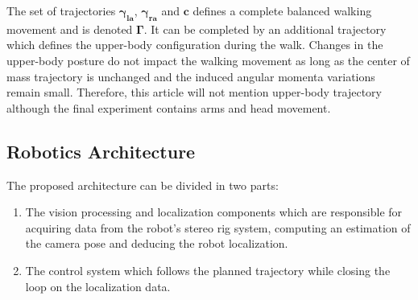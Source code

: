 The set of trajectories $\mathbf{\gamma_{\text{la}}}$, $\mathbf{\gamma_{\text{ra}}}$ and $\mathbf{c}$ defines a complete balanced walking movement and is denoted $\mathbf{\Gamma}$. It can be completed by an additional trajectory which defines the upper-body configuration during the walk. Changes in the upper-body posture do not impact the walking movement as long as the center of mass trajectory is unchanged and the induced angular momenta variations remain small. Therefore, this article will not mention upper-body trajectory although the final experiment contains arms and head movement.

\subsection{Robotics Architecture}

The proposed architecture can be divided in two parts:
\begin{enumerate}
\item The vision processing and localization components which are responsible for acquiring data from the robot's stereo rig system, computing an estimation of the camera pose and deducing the robot localization.
\item The control system which follows the planned trajectory while closing the loop on the localization data.
\end{enumerate}

